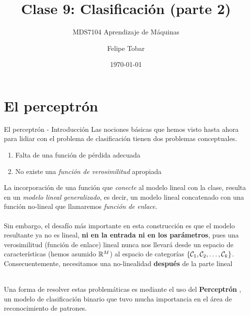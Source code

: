 \documentclass[handout, 9pt]{beamer}
\title{Clase 9: Clasificación (parte 2)}
\subtitle{MDS7104 Aprendizaje de Máquinas}
\date{\today}
\author{Felipe Tobar}
\institute{Iniciativa de Datos e Inteligencia Artificial\\Universidad de Chile}
\begin{document}
\begin{frame}
  \titlepage
\end{frame}

\section{El perceptrón}

\begin{frame}{El perceptrón - Introducción}
Las nociones básicas que hemos visto hasta ahora para lidiar con el problema de clasificación tienen dos problemas conceptuales. \pause
\begin{enumerate}
  \item Falta de una función de pérdida adecuada \pause
  \item No existe una \emph{función de verosimilitud} apropiada \pause
\end{enumerate}

La incorporación de una función que \emph{conecte} al modelo lineal con la clase, resulta en un \emph{modelo lineal generalizado}, es decir, un modelo lineal concatenado con una función no-lineal que llamaremos \emph{función de enlace}.\\~\\


Sin embargo, el desafío más importante en esta construcción es que el modelo resultante ya no es lineal, \textbf{ni en la entrada ni en los parámetros}, pues una verosimilitud (función de enlace) lineal nunca nos llevará desde un espacio de características  (hemos asumido $\mathbb{R}^M$) al espacio de categorías $\{{\mathcal C}_1,{\mathcal C}_2,\ldots,{\mathcal C}_k\}$. Consecuentemente, necesitamos una no-linealidad \textbf{después} de la parte lineal \\~\

Una forma de resolver estas problemáticas es mediante el uso del \textbf{Perceptrón} \cite{rosenblatt_1958}, un modelo de clasificación binario que tuvo mucha importancia en el área de reconocimiento de patrones.

\end{frame}
\end{document}
